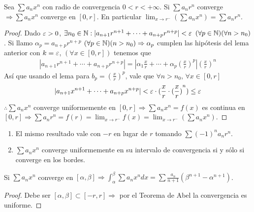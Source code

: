 \begin{theorem}[Abel]
  Sea \(\sum a_n x^n\) con radio de convergencia \(0 < r < +\infty\). Si \(\sum a_n r^n\) converge \(\Rightarrow \sum a_n x^n\) converge en \([0, r]\). En particular \(\lim_{x \to r^-} (\sum a_n x^n) = \sum a_n r^n\).
  \begin{proof}
    Dado \(\varepsilon > 0\), \(\exists n_0 \in \mathbb{N} : |a_{n+1} r^{n+1} + \cdots + a_{n+p} r^{n+p}| < \varepsilon \) \((\forall p \in \mathbb{N}) (\forall n > n_0)\). Si llamo \(\alpha_p = a_{n+p} r^{n+p} \) \((\forall p \in \mathbb{N})(n > n_0) \Rightarrow \alpha_p\)
    cumplen las hipótesis del lema anterior con \(k = \varepsilon \), \((\forall x \in [0, r])\) tenemos que \begin{align*}
      |a_{n+1} r^{n+1} + \cdots + a_{n+p} r^{n+p}| = |\alpha_1 \frac{x}{r} + \cdots + \alpha_p (\frac{x}{r})^p| (\frac{x}{r})^n
    \end{align*} Así que usando el lema para \(b_p = (\frac{x}{r})^p\), vale que \(\forall n > n_0\), \(\forall x \in [0, r]\)
    \begin{align*}
      |a_{n+1} x^{n+1} + \cdots + a_{n + p} x^{n+p}| < \varepsilon \cdot (\frac{x}{r} \cdot {(\frac{x}{r})}^n) \leq \varepsilon
    \end{align*} \(\therefore \sum a_n x^n\) converge uniformemente en \([0, r] \Rightarrow \sum a_n x^n = f(x)\) es continua en \([0, r] \Rightarrow \sum a_n r^n = f(r) = \lim_{x \to r^-} f(x) = \lim_{x \to r^-} (\sum a_n x^n)\).
  \end{proof}
\end{theorem}

\begin{note}
  \begin{enumerate}
    \item El mismo resultado vale con \(-r\) en lugar de \(r\) tomando \(\sum (-1)^n a_n r^n\).
    \item \(\sum a_n x^n\) converge uniformemente en su intervalo de convergencia si y sólo si converge en los bordes.
  \end{enumerate}
\end{note}

\begin{theorem}
  Si \(\sum a_n x^n\) converge en \([\alpha, \beta] \Rightarrow \int_{\alpha}^{\beta} \sum a_n x^n dx = \sum \frac{a_n}{n+1} (\beta^{n+1} - \alpha^{n+1})\).
  \begin{proof}
    Debe ser \([\alpha, \beta] \subset [-r, r] \Rightarrow \) por el Teorema de Abel la convergencia es uniforme.
  \end{proof}
\end{theorem}

